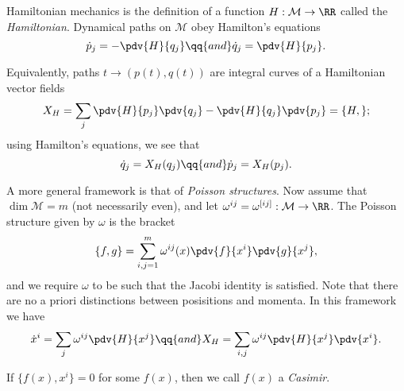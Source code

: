 \documentclass{jknotes}
\begin{document}
Hamiltonian mechanics is the definition of a function \(H:\mathcal{M}\to\RR\) called the \emph{Hamiltonian}. Dynamical paths on \(\mathcal{M}\) obey Hamilton's equations
\begin{equation}
    \dot{p}_j = -\pdv{H}{q_j} \qq{and} \dot{q}_j=\pdv{H}{p_j}.
\end{equation}

Equivalently, paths \(t\to(p(t),q(t))\) are integral curves of a Hamiltonian vector fields
\begin{equation}
    X_H = \sum_j \pdv{H}{p_j}\pdv{q_j} - \pdv{H}{q_j}\pdv{p_j} = \{H,\};
\end{equation}
using Hamilton's equations, we see that
\begin{equation}
    \dot{q}_j = X_H(q_j) \qq{and} \dot{p}_j = X_H(p_j).
\end{equation}

A more general framework is that of \emph{Poisson structures}. Now assume that \(\dim \mathcal{M}=m\) (not necessarily even), and let \(\omega^{ij}=\omega^{[ij]}:\mathcal{M}\to\RR\). The Poisson structure given by \(\omega\) is the bracket
\begin{equation}
    \{f,g\} = \sum^m_{i,j=1} \omega^{ij}(x)\pdv{f}{x^i}\pdv{g}{x^j},
\end{equation}
and we require \(\omega\) to be such that the Jacobi identity is satisfied. Note that there are no a priori distinctions between posisitions and momenta. In this framework we have
\begin{equation}
    \dot{x}^i = \sum_j\omega^{ij}\pdv{H}{x^j} \qq{and} X_H = \sum_{i,j} \omega^{ij}\pdv{H}{x^j}\pdv{x^i}.
\end{equation}

If \(\{f(x),x^i\}=0\) for some \(f(x)\), then we call \(f(x)\) a \emph{Casimir}.
\end{document}
